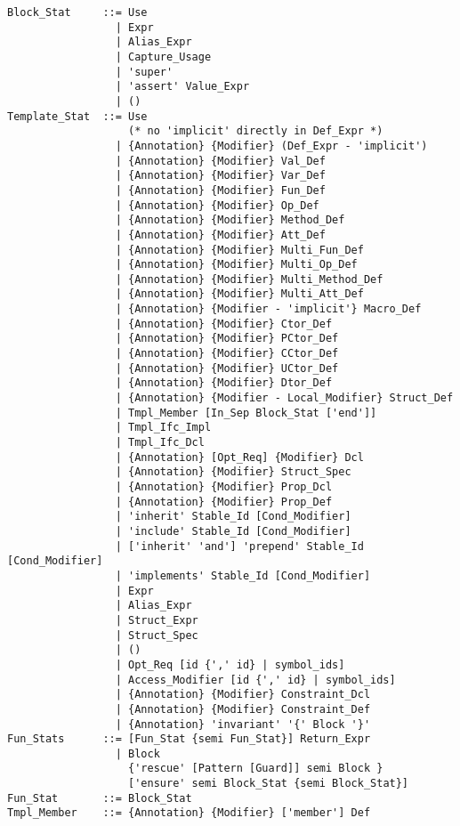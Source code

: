 \syntax\begin{lstlisting}
Block_Stat     ::= Use
                 | Expr
                 | Alias_Expr
                 | Capture_Usage
                 | 'super'
                 | 'assert' Value_Expr
                 | ()
Template_Stat  ::= Use
                   (* no 'implicit' directly in Def_Expr *)
                 | {Annotation} {Modifier} (Def_Expr - 'implicit')
                 | {Annotation} {Modifier} Val_Def
                 | {Annotation} {Modifier} Var_Def
                 | {Annotation} {Modifier} Fun_Def
                 | {Annotation} {Modifier} Op_Def
                 | {Annotation} {Modifier} Method_Def
                 | {Annotation} {Modifier} Att_Def
                 | {Annotation} {Modifier} Multi_Fun_Def
                 | {Annotation} {Modifier} Multi_Op_Def
                 | {Annotation} {Modifier} Multi_Method_Def
                 | {Annotation} {Modifier} Multi_Att_Def
                 | {Annotation} {Modifier - 'implicit'} Macro_Def
                 | {Annotation} {Modifier} Ctor_Def
                 | {Annotation} {Modifier} PCtor_Def
                 | {Annotation} {Modifier} CCtor_Def
                 | {Annotation} {Modifier} UCtor_Def
                 | {Annotation} {Modifier} Dtor_Def
                 | {Annotation} {Modifier - Local_Modifier} Struct_Def
                 | Tmpl_Member [In_Sep Block_Stat ['end']]
                 | Tmpl_Ifc_Impl
                 | Tmpl_Ifc_Dcl
                 | {Annotation} [Opt_Req] {Modifier} Dcl
                 | {Annotation} {Modifier} Struct_Spec
                 | {Annotation} {Modifier} Prop_Dcl
                 | {Annotation} {Modifier} Prop_Def
                 | 'inherit' Stable_Id [Cond_Modifier]
                 | 'include' Stable_Id [Cond_Modifier]
                 | ['inherit' 'and'] 'prepend' Stable_Id [Cond_Modifier]
                 | 'implements' Stable_Id [Cond_Modifier]
                 | Expr
                 | Alias_Expr
                 | Struct_Expr
                 | Struct_Spec
                 | ()
                 | Opt_Req [id {',' id} | symbol_ids]
                 | Access_Modifier [id {',' id} | symbol_ids]
                 | {Annotation} {Modifier} Constraint_Dcl
                 | {Annotation} {Modifier} Constraint_Def
                 | {Annotation} 'invariant' '{' Block '}'
Fun_Stats      ::= [Fun_Stat {semi Fun_Stat}] Return_Expr
                 | Block
                   {'rescue' [Pattern [Guard]] semi Block }
                   ['ensure' semi Block_Stat {semi Block_Stat}]
Fun_Stat       ::= Block_Stat
Tmpl_Member    ::= {Annotation} {Modifier} ['member'] Def

\end{lstlisting}
